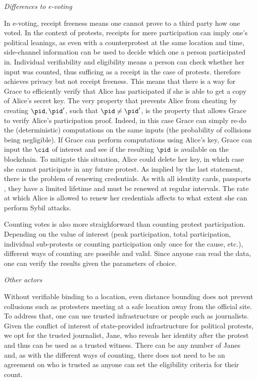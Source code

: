 \emph{Differences to e-voting}

In e-voting, receipt freeness means one cannot prove to a third party
how one voted. In the context of protests, receipts for mere
participation can imply one's political leanings, as even with a
counterprotest at the same location and time, side-channel information
can be used to decide which one a person participated in. Individual
verifiability and eligibility means a person can check whether her input was counted,
thus sufficing as a receipt in the case of protests. 
\PRIVO therefore achieves privacy but not receipt freeness.
This means that there is a way for Grace to efficiently verify that
Alice has participated if she is able to get a copy of Alice's secret
key. The very property that prevents Alice from cheating by creating \(\pid, \pid'\), 
such that \(\pid \neq \pid'\), is the property that allows Grace to verify 
Alice's participation proof.
Indeed, in this case Grace can simply re-do the (deterministic)
computations on the same inputs (the probability of collisions being
negligible).
If Grace can perform computations using Alice's key, Grace can input the 
\(\cid\) of interest and see if the resulting \(\pid\) is available on the 
blockchain.
To mitigate this situation, Alice could delete her key, in which case she cannot 
participate in any future protest.
As implied by the last statement, there is the problem of renewing credentials.
As with all identity cards, passports \etc, they have a limited lifetime and 
must be renewed at regular intervals.
The rate at which Alice is allowed to renew her credentials affects to what 
extent she can perform Sybil attacks.

Counting votes is also more straighforward than counting protest
participation. Depending on the value of interest (peak participation,
total participation, individual sub-protests or counting participation
only once for the cause, etc.), different ways of counting are
possible and valid. Since anyone can read the data, one can verify the
results given the parameters of choice.

\emph{Other actors}

Without verifiable binding to a location, even distance bounding does
not prevent collusions such as protesters meeting at a safe location
away from the official site. To address that, one can use trusted
infrastructure \cite{lemonde}  or people such as journalists. Given
the conflict of interest of state-provided infrastructure for
political protests, we opt for the trusted journalist, Jane, who
reveals her identity after the protest and thus can be used as a
trusted witness. There can be any number of Janes and, as with the
different ways of counting, there does not need to be an agreement on
who is trusted as anyone can set the eligibility criteria for their count.

